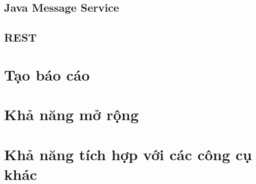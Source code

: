 \documentclass[10pt]{report}
\begin{document}
\subsection{Java Message Service}

\subsection{REST}

\section{Tạo báo cáo}

\section{Khả năng mở rộng}

\section{Khả năng tích hợp với các công cụ khác}
\end{document}
